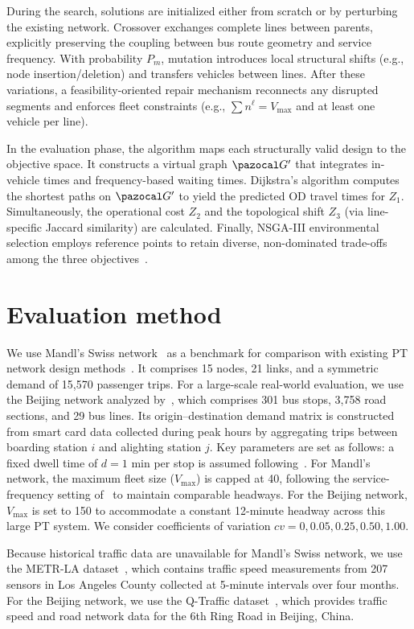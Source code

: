 \documentclass[11pt,a4paper]{article} %
\begin{document}
During the search, solutions are initialized either from scratch or by perturbing the existing network. Crossover exchanges complete lines between parents, explicitly preserving the coupling between bus route geometry and service frequency. With probability $P_m$, mutation introduces local structural shifts (e.g., node insertion/deletion) and transfers vehicles between lines. After these variations, a feasibility-oriented repair mechanism reconnects any disrupted segments and enforces fleet constraints (e.g., $\sum n^\ell = V_{\max}$ and at least one vehicle per line).

In the evaluation phase, the algorithm maps each structurally valid design to the objective space. It constructs a virtual graph $\pazocal G'$ that integrates in-vehicle times and frequency-based waiting times. Dijkstra's algorithm computes the shortest paths on $\pazocal G'$ to yield the predicted OD travel times for $Z_1$. Simultaneously, the operational cost $Z_2$ and the topological shift $Z_3$ (via line-specific Jaccard similarity) are calculated. Finally, NSGA-III environmental selection employs reference points to retain diverse, non-dominated trade-offs among the three objectives~\citep{deb2014nsga3}.

\section{Evaluation method}
We use Mandl's Swiss network~\citep{mandl1980evaluation} as a benchmark for comparison with existing PT network design methods~\citep{liang2025novel,ahern2022approximate}. It comprises 15 nodes, 21 links, and a symmetric demand of 15,570 passenger trips. For a large-scale real-world evaluation, we use the Beijing network analyzed by~\citet{wu2024multi}, which comprises 301 bus stops, 3,758 road sections, and 29 bus lines. Its origin--destination demand matrix is constructed from smart card data collected during peak hours by aggregating trips between boarding station $i$ and alighting station $j$. Key parameters are set as follows: a fixed dwell time of $d=1$ min per stop is assumed following~\citet{chen2022TRSC}. For Mandl's network, the maximum fleet size ($V_{\max}$) is capped at 40, following the service-frequency setting of~\citet{ahern2022approximate} to maintain comparable headways. For the Beijing network, $V_{\max}$ is set to 150 to accommodate a constant 12-minute headway across this large PT system. We consider coefficients of variation $cv=0,0.05,0.25,0.50,1.00$.

Because historical traffic data are unavailable for Mandl's Swiss network, we use the METR-LA dataset~\citep{li2017diffusion}, which contains traffic speed measurements from 207 sensors in Los Angeles County collected at 5-minute intervals over four months. For the Beijing network, we use the Q-Traffic dataset~\citep{liao2018deep}, which provides traffic speed and road network data for the 6th Ring Road in Beijing, China.
\end{document}
